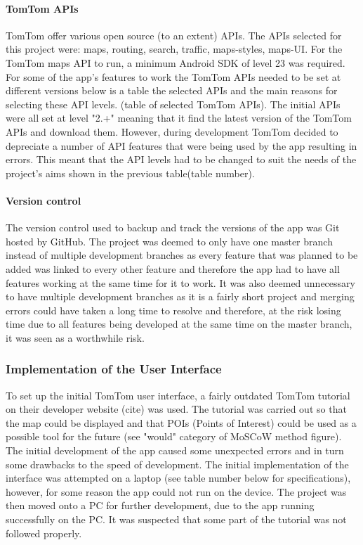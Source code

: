 \documentclass[12pt,a4paper]{article}
\begin{document}
\paragraph{TomTom APIs}
TomTom offer various open source (to an extent) APIs. The APIs selected for this project were: maps, routing, search, traffic, maps-styles, maps-UI. For the TomTom maps API to run, a minimum Android SDK of level 23 was required. For some of the app's features to work the TomTom APIs needed to be set at different versions below is a table the selected APIs and the main reasons for selecting these API levels. (table of selected TomTom APIs). The initial APIs were all set at level "2.+" meaning that it find the latest version of the TomTom APIs and download them. However, during development TomTom decided to depreciate a number of API features that were being used by the app resulting in errors. This meant that the API levels had to be changed to suit the needs of the project's aims shown in the previous table(table number).    

\paragraph{Version control}
The version control used to backup and track the versions of the app was Git hosted by GitHub. The project was deemed to only have one master branch instead of multiple development branches as every feature that was planned to be added was linked to every other feature and therefore the app had to have all features working at the same time for it to work. It was also deemed unnecessary to have multiple development branches as it is a fairly short project and merging errors could have taken a long time to resolve and therefore, at the risk losing time due to all features being developed at the same time on the master branch, it was seen as a worthwhile risk.

\subsubsection{Implementation of the User Interface}
To set up the initial TomTom user interface, a fairly outdated TomTom tutorial on their developer website (cite) was used. The tutorial was carried out so that the map could be displayed and that POIs (Points of Interest) could be used as a possible tool for the future (see "would" category of MoSCoW method figure). The initial development of the app caused some unexpected errors and in turn some drawbacks to the speed of development. The initial implementation of the interface was attempted on a laptop (see table number below for specifications), however, for some reason the app could not run on the device. The project was then moved onto a PC for further development, due to the app running successfully on the PC. It was suspected that some part of the tutorial was not followed properly.
\end{document}
